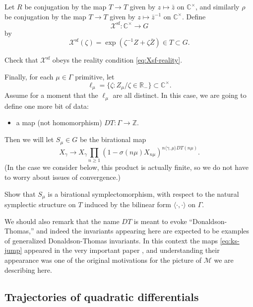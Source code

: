 \documentclass[12pt,letterpaper,reqno]{article}
\numberwithin{equation}{section}
\newcommand{\cM}{\ensuremath{\mathcal M}}
\newcommand{\cX}{\ensuremath{\mathcal X}}
\newcommand{\R}{\ensuremath{\mathbb R}}
\newcommand{\C}{\ensuremath{\mathbb C}}
\newcommand{\Z}{\ensuremath{\mathbb Z}}
\renewcommand{\sf}{\mathrm{sf}}
\newcommand{\IP}[1]{\langle#1\rangle}
\begin{document}
Let $R$ be conjugation by the map $T \to T$ given by
$z \mapsto \bar{z}$ on $\C^\times$, and similarly
$\rho$ be conjugation by the map
$T \to T$ given by $z \mapsto \bar{z}^{-1}$ on $\C^\times$.
Define
\begin{equation}
\cX^\sf: \C^\times \to G
\end{equation}
by
\begin{equation}
\cX^\sf(\zeta) = \exp(\zeta^{-1} Z + \zeta \bar{Z}) \in T \subset G.
\end{equation}

\begin{exercise} Check that $\cX^\sf$ obeys the reality condition
\eqref{eq:Xsf-reality}.
\end{exercise}

Finally, for each $\mu \in \Gamma$ primitive, let
$$\ell_\mu = \{ \zeta: Z_\mu / \zeta \in \R_- \} \subset \C^\times. $$
Assume for a moment that the $\ell_\mu$
are all distinct.
In this case, we are going to define one more bit of data:
\begin{itemize}
  \item a map (not homomorphism) $DT: \Gamma \to \Z$.
\end{itemize}
Then we will let $S_\mu \in G$ be the birational map
\begin{equation} \label{eq:ks-jump}
  X_\gamma \to X_\gamma \prod_{n \ge 1} (1 - \sigma(n\mu) X_{n\mu})^{n \IP{\gamma,\mu} DT(n\mu)}.
\end{equation}
(In the case we consider below, this product is actually finite,
so we do not have to worry about issues of convergence.)

\begin{exercise} Show that $S_\mu$ is a birational symplectomorphism,
with respect to the natural symplectic structure on $T$ induced by
the bilinear form $\IP{\cdot,\cdot}$ on $\Gamma$.
\end{exercise}

We should also remark that the name $DT$ is meant to
evoke ``Donaldson-Thomas,'' and indeed the invariants
appearing here are expected to be
examples of generalized Donaldson-Thomas invariants.
In this context the maps \eqref{eq:ks-jump} appeared
in the very important paper \cite{ks1}, and understanding
their appearance was one of the original motivations
for the picture of $\cM$ we are describing here.



\subsection{Trajectories of quadratic differentials}
\end{document}
